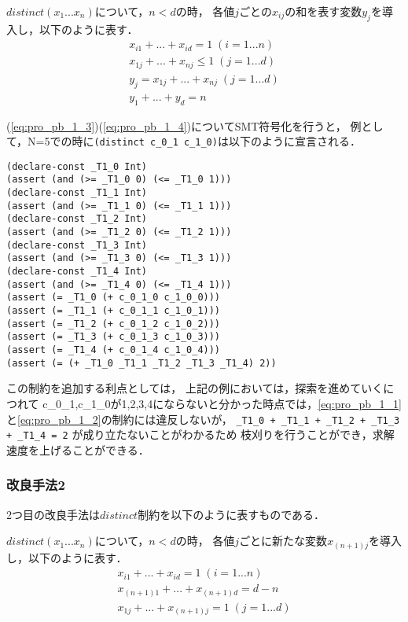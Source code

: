 $distinct(x_1 ... x_n)$について，$n < d$の時，
各値$j$ごとの$x_{ij}$の和を表す変数$y_j$を導入し，以下のように表す．
\begin{eqnarray}
    x_{i1} + ... + x_{id}=1 \; (i=1 ... n) \label{eq:pro_pb_1_1}\\
    x_{1j} + ... + x_{nj}\leq1 \; (j=1 ... d) \label{eq:pro_pb_1_2}\\
    y_j = x_{1j} + ... + x_{nj} \; (j=1 ... d) \label{eq:pro_pb_1_3}\\
    y_1 + ... + y_d =n \label{eq:pro_pb_1_4}
\end{eqnarray}

(\ref{eq:pro_pb_1_3})(\ref{eq:pro_pb_1_4})についてSMT符号化を行うと，
例として，N=5での時に\verb|(distinct c_0_1 c_1_0)|は以下のように宣言される．

{ \footnotesize \begin{verbatim}
(declare-const _T1_0 Int)
(assert (and (>= _T1_0 0) (<= _T1_0 1)))
(declare-const _T1_1 Int)
(assert (and (>= _T1_1 0) (<= _T1_1 1)))
(declare-const _T1_2 Int)
(assert (and (>= _T1_2 0) (<= _T1_2 1)))
(declare-const _T1_3 Int)
(assert (and (>= _T1_3 0) (<= _T1_3 1)))
(declare-const _T1_4 Int)
(assert (and (>= _T1_4 0) (<= _T1_4 1)))
(assert (= _T1_0 (+ c_0_1_0 c_1_0_0)))
(assert (= _T1_1 (+ c_0_1_1 c_1_0_1)))
(assert (= _T1_2 (+ c_0_1_2 c_1_0_2)))
(assert (= _T1_3 (+ c_0_1_3 c_1_0_3)))
(assert (= _T1_4 (+ c_0_1_4 c_1_0_4)))
(assert (= (+ _T1_0 _T1_1 _T1_2 _T1_3 _T1_4) 2))
\end{verbatim}}

この制約を追加する利点としては，
上記の例においては，探索を進めていくにつれて
c\_0\_1,c\_1\_0が1,2,3,4にならないと分かった時点では，\ref{eq:pro_pb_1_1}と\ref{eq:pro_pb_1_2}の制約には違反しないが，
{\small \verb|_T1_0 + _T1_1 + _T1_2 + _T1_3 + _T1_4 = 2| }が成り立たないことがわかるため
枝刈りを行うことができ，求解速度を上げることができる．

\subsubsection{改良手法2}\label{sec:pro_hint_3_2}
2つ目の改良手法は$distinct$制約を以下のように表すものである．

$distinct(x_1 ... x_n)$について，$n < d$の時，
各値$j$ごとに新たな変数$x_{(n+1)j}$を導入し，以下のように表す．
\begin{eqnarray}
    x_{i1} + ... + x_{id}=1 \; (i=1 ... n) \label{eq:pro_pb_2_1}\\
    x_{(n+1)1} + ... + x_{(n+1)d}=d-n \label{eq:pro_pb_2_2}\\
    x_{1j} + ... + x_{(n+1)j}=1 \; (j=1 ... d) \label{eq:pro_pb_2_3}\\
\end{eqnarray}

